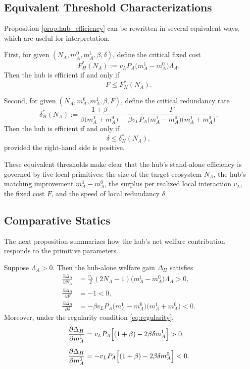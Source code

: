 \subsection{Equivalent Threshold Characterizations}

Proposition \ref{prop:hub_efficiency} can be rewritten in several equivalent ways, which are useful for interpretation.

First, for given $(N_A,m_A^0,m_A^1,\beta,\delta)$, define the critical fixed cost
\begin{equation}
F_H^*(N_A)
:=
v_L P_A \bigl(m_A^1-m_A^0\bigr)\Lambda_A.
\label{eq:Fstar}
\end{equation}
Then the hub is efficient if and only if
\[
F \le F_H^*(N_A).
\]

Second, for given $(N_A,m_A^0,m_A^1,\beta,F)$, define the critical redundancy rate
\begin{equation}
\delta_H^*(N_A)
:=
\frac{1+\beta}{\beta\bigl(m_A^1+m_A^0\bigr)}
-
\frac{F}{\beta v_L P_A\bigl(m_A^1-m_A^0\bigr)\bigl(m_A^1+m_A^0\bigr)}.
\label{eq:deltastar}
\end{equation}
Then the hub is efficient if and only if
\[
\delta \le \delta_H^*(N_A),
\]
provided the right-hand side is positive.

These equivalent thresholds make clear that the hub's stand-alone efficiency is governed by five local primitives: the size of the target ecosystem $N_A$, the hub's matching improvement $m_A^1-m_A^0$, the surplus per realized local interaction $v_L$, the fixed cost $F$, and the speed of local redundancy $\delta$.

\subsection{Comparative Statics}

The next proposition summarizes how the hub's net welfare contribution responds to the primitive parameters.

\begin{proposition}
\label{prop:comparative_statics_hub}
Suppose $\Lambda_A>0$. Then the hub-alone welfare gain $\Delta_H$ satisfies
\begin{align}
\frac{\partial \Delta_H}{\partial N_A}
&=
\frac{v_L}{2}(2N_A-1)\bigl(m_A^1-m_A^0\bigr)\Lambda_A
>0,
\label{eq:dDelta_dN}
\\[0.4em]
\frac{\partial \Delta_H}{\partial F}
&=
-1
<0,
\label{eq:dDelta_dF}
\\[0.4em]
\frac{\partial \Delta_H}{\partial \delta}
&=
-\beta v_L P_A \bigl(m_A^1-m_A^0\bigr)\bigl(m_A^1+m_A^0\bigr)
<0.
\label{eq:dDelta_ddelta}
\end{align}
Moreover, under the regularity condition \eqref{eq:regularity},
\begin{align}
\frac{\partial \Delta_H}{\partial m_A^1}
&=
v_L P_A\Bigl[(1+\beta)-2\beta\delta m_A^1\Bigr]
>0,
\label{eq:dDelta_dm1}
\\[0.4em]
\frac{\partial \Delta_H}{\partial m_A^0}
&=
- v_L P_A\Bigl[(1+\beta)-2\beta\delta m_A^0\Bigr]
<0.
\label{eq:dDelta_dm0}
\end{align}
\end{proposition}

